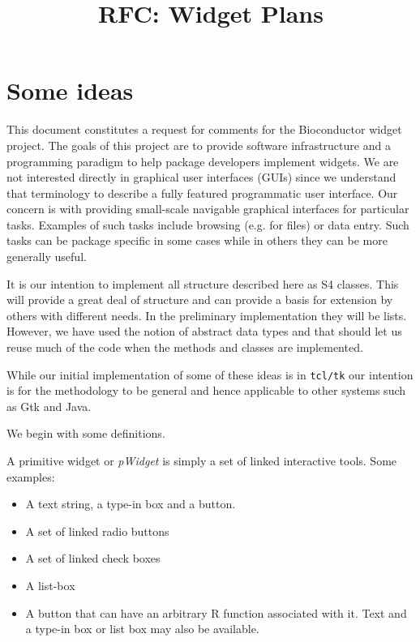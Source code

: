 \documentclass{article}
\begin{document}
\title{RFC: Widget Plans}
\maketitle


\section*{Some ideas}

This document constitutes a request for comments for the Bioconductor
widget project.
The goals of this project are to provide software infrastructure and a
programming paradigm to help package developers implement widgets.
We are not interested directly in graphical user interfaces (GUIs)
since we understand that terminology to describe a fully featured
programmatic user interface. Our concern is with providing small-scale
navigable graphical interfaces for particular tasks. Examples of such
tasks include browsing (e.g. for files) or data entry. Such
tasks can be package specific in some cases while in others they can
be more generally useful.

It is our intention to implement all structure described here as S4
classes. This will provide a great deal of structure and can provide a
basis for extension by others with different needs. In the preliminary
implementation they will be lists. However, we have used the notion of
abstract data types and that should let us reuse much of the
code when the methods and classes are implemented.

While our initial implementation of some of these ideas is in
\verb+tcl/tk+ our intention is for the methodology to be general and
hence applicable to other systems such as Gtk and Java.

We begin with some definitions.

A primitive widget or {\em pWidget} is simply a set of linked interactive
tools.
Some examples:
\begin{itemize}
\item A text string, a type-in box and a button.
\item A set of linked radio buttons
\item A set of linked check boxes
\item A list-box
\item A button that can have an arbitrary R function associated with
  it. Text and a type-in box or list box may also be available.
\end{itemize}
\end{document}
